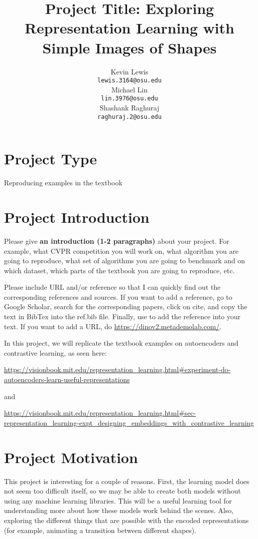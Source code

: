 \documentclass{article}
\title{Project Title: Exploring Representation Learning with Simple Images of Shapes}
\author{%
  Kevin Lewis\\
  \texttt{lewis.3164@osu.edu} \\
  \And
  Michael Lin\\
  \texttt{lin.3976@osu.edu} \\
    \And
  Shashank Raghuraj\\
  \texttt{raghuraj.2@osu.edu} \\
}
\begin{document}
\maketitle



\section{Project Type}
Reproducing examples in the textbook

\section{Project Introduction}
{\color{red}
Please give \textbf{an introduction (1-2 paragraphs)} about your project. For example, what CVPR competition you will work on, what algorithm you are going to reproduce, what set of algorithms you are going to benchmark and on which dataset, which parts of the textbook you are going to reproduce, etc. 


Please include URL and/or reference so that I can quickly find out the corresponding references and sources. If you want to add a reference, go to Google Scholar, search for the corresponding papers, click on cite, and copy the text in BibTex into the ref.bib file. Finally, use \cite{oquab2023dinov2} to add the reference into your text. 
If you want to add a URL, do \url{https://dinov2.metademolab.com/}.

} 

In this project, we will replicate the textbook examples on autoencoders and contrastive learning, as seen here: 

\url{https://visionbook.mit.edu/representation_learning.html#experiment-do-autoencoders-learn-useful-representations}

and 

\url{https://visionbook.mit.edu/representation_learning.html#sec-representation_learning-expt_designing_embeddings_with_contrastive_learning}


\section{Project Motivation}

This project is interesting for a couple of reasons. First, the learning model does not seem too difficult itself, so we may be able to create both models without using any machine learning libraries.  This will be a useful learning tool for understanding more about how these models work behind the scenes.  Also, exploring the different things that are possible with the encoded representations (for example, animating a transition between different shapes).
\end{document}
